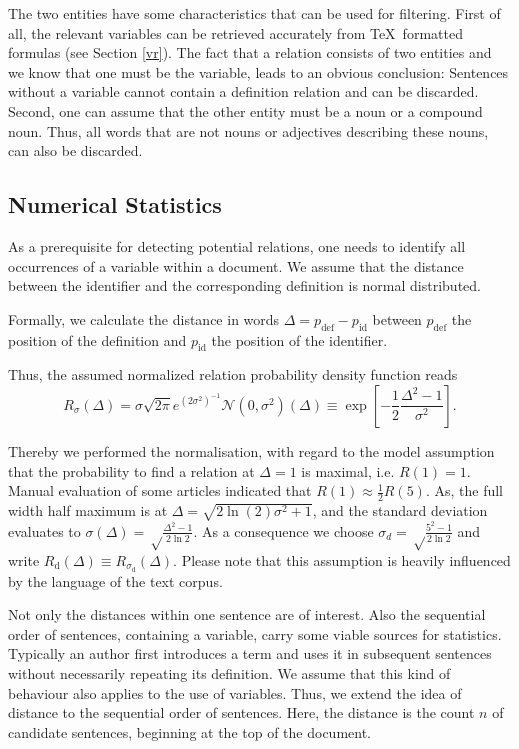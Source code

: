 \documentclass[runningheads]{llncs}
\begin{document}
The two entities have some characteristics that can be used for filtering. First of all, the relevant variables can be retrieved accurately from \TeX\ formatted formulas (see Section \ref{vr}). The fact that a relation consists of two entities and we know that one must be the variable, leads to an obvious conclusion: Sentences without a variable cannot contain a definition relation and can be discarded.
Second, one can assume that the other entity must be a noun or a compound noun. Thus, all words that are not nouns or adjectives describing these nouns, can also be discarded.


\subsection{Numerical Statistics}
As a prerequisite for detecting potential relations, one needs to identify all occurrences of a variable within a document.
We assume that the distance between the identifier and the corresponding definition is normal distributed.

Formally, we calculate the distance in words $\Delta=p_\mathrm{def}-p_\mathrm{id}$  between $p_\mathrm{def}$ the position of the definition and $p_\mathrm{id}$ the position of the identifier.

Thus, the assumed normalized relation probability density function reads
\begin{equation}
\label{eq:dist}
R_\sigma(\Delta)= {\sigma \sqrt{2\pi}}{e^{{\left(2\sigma^2\right)^{-1}}}} \mathcal N(0,\sigma^2)(\Delta)\equiv \exp\left[-\frac{1}{2}\frac{\Delta^2-1}{\sigma^2}\right].
\end{equation}
\newcommand{\normalPlot}[2]{(e^((-1/2)*(((#1)^2-1)/(#2)^2)))} %
\newcommand{\normalPlotFWHM}[2]{\normalPlot{#1}{ sqrt(((#2)^2-1)/(2*ln(2)))}}

Thereby we performed the normalisation, with regard to the model assumption that the probability to find a relation at $\Delta=1$ is maximal, i.e. $R(1)=1$. 
Manual evaluation of some articles indicated that $R(1)\approx\frac{1}{2}R(5)$.
As, the full width half maximum is at $\Delta=\sqrt{2 \ln(2)  \sigma^2+1}$, and the standard deviation evaluates to $\sigma(\Delta)=\sqrt\frac{\Delta^2-1}{2\ln 2}$. As a consequence we choose $\sigma_d=\sqrt\frac{5^2-1}{2\ln 2}$ and write $R_\mathrm{d}(\Delta) \equiv R_{\sigma_\mathrm{d}}(\Delta) $. Please note that this assumption is heavily influenced by the language of the text corpus. 

Not only the distances within one sentence are of interest. Also the sequential order of sentences, containing a variable, carry some viable sources for statistics. Typically an author first introduces a term and uses it in subsequent sentences without necessarily repeating its definition. We assume that this kind of behaviour also applies to the use of variables. Thus, we extend the idea of distance to the sequential order of sentences. Here, the distance is the count $n$ of candidate sentences, beginning at the top of the document.
\end{document}
